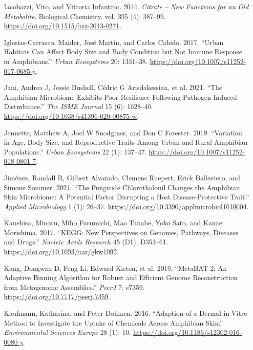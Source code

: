 \documentclass[
  12pt,
]{article}
\newlength{\cslhangindent}
\newenvironment{CSLReferences}[2] %
 {\begin{list}{}{%
  \setlength{\itemindent}{0pt}
  \setlength{\leftmargin}{0pt}
  \setlength{\parsep}{0pt}
  \ifodd #1
   \setlength{\leftmargin}{\cslhangindent}
   \setlength{\itemindent}{-1\cslhangindent}
  \fi
  \setlength{\itemsep}{#2\baselineskip}}}
 {\end{list}}
\begin{document}
\begin{CSLReferences}{1}{1}
Iacobazzi, Vito, and Vittoria Infantino. 2014. \emph{Citrate -- New
Functions for an Old Metabolite}. Biological {Chemistry}, vol. 395 (4):
387--99. \url{https://doi.org/10.1515/hsz-2013-0271}.

Iglesias-Carrasco, Maider, José Martín, and Carlos Cabido. 2017.
{``Urban Habitats Can Affect Body Size and Body Condition but Not Immune
Response in Amphibians.''} \emph{Urban Ecosystems} 20: 1331--38.
\url{https://doi.org/10.1007/s11252-017-0685-y}.

Jani, Andrea J, Jessie Bushell, Cédric G Arisdakessian, et al. 2021.
{``The Amphibian Microbiome Exhibits Poor Resilience Following
Pathogen-Induced Disturbance.''} \emph{The ISME Journal} 15 (6):
1628--40. \url{https://doi.org/10.1038/s41396-020-00875-w}.

Jennette, Matthew A, Joel W Snodgrass, and Don C Forester. 2019.
{``Variation in Age, Body Size, and Reproductive Traits Among Urban and
Rural Amphibian Populations.''} \emph{Urban Ecosystems} 22 (1): 137--47.
\url{https://doi.org/10.1007/s11252-018-0801-7}.

Jiménez, Randall R, Gilbert Alvarado, Clemens Ruepert, Erick Ballestero,
and Simone Sommer. 2021. {``The Fungicide Chlorothalonil Changes the
Amphibian Skin Microbiome: A Potential Factor Disrupting a Host
Disease-Protective Trait.''} \emph{Applied Microbiology} 1 (1): 26--37.
\url{https://doi.org/10.3390/applmicrobiol1010004}.

Kanehisa, Minoru, Miho Furumichi, Mao Tanabe, Yoko Sato, and Kanae
Morishima. 2017. {``{KEGG}: New Perspectives on Genomes, Pathways,
Diseases and Drugs.''} \emph{Nucleic Acids Research} 45 (D1): D353--61.
\url{https://doi.org/10.1093/nar/gkw1092}.

Kang, Dongwan D, Feng Li, Edward Kirton, et al. 2019. {``{MetaBAT} 2: An
Adaptive Binning Algorithm for Robust and Efficient Genome
Reconstruction from Metagenome Assemblies.''} \emph{PeerJ} 7: e7359.
\url{https://doi.org/10.7717/peerj.7359}.

Kaufmann, Katharina, and Peter Dohmen. 2016. {``Adaption of a Dermal in
Vitro Method to Investigate the Uptake of Chemicals Across Amphibian
Skin.''} \emph{Environmental Sciences Europe} 28 (1): 10.
\url{https://doi.org/10.1186/s12302-016-0080-y}.


\end{CSLReferences}
\end{document}

